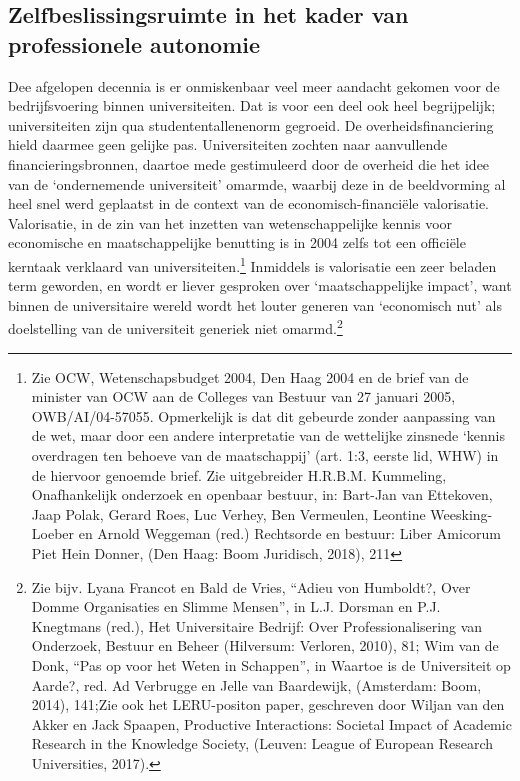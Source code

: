 \documentclass[empirical, authordate, ]{new-jote-article}
\begin{document}
	\subsection{Zelfbeslissingsruimte in het kader van professionele autonomie}



	Dee afgelopen decennia is er onmiskenbaar veel meer aandacht gekomen voor de bedrijfsvoering binnen universiteiten. Dat is voor een deel ook heel begrijpelijk; universiteiten zijn qua studententallenenorm gegroeid. De overheidsfinanciering hield daarmee geen gelijke pas. Universiteiten zochten naar aanvullende financieringsbronnen, daartoe mede gestimuleerd door de overheid die het idee van de ‘ondernemende universiteit' omarmde, waarbij deze in de beeldvorming al heel snel werd geplaatst in de context van de economisch-financiële valorisatie. Valorisatie, in de zin van het inzetten van wetenschappelijke kennis voor economische en maatschappelijke benutting is in 2004 zelfs tot een officiële kerntaak verklaard van universiteiten.\footnote{Zie OCW, Wetenschapsbudget 2004, Den Haag 2004 en de brief van de minister van OCW aan de Colleges van Bestuur van 27 januari 2005, OWB/AI/04-57055. Opmerkelijk is dat dit gebeurde zonder aanpassing van de wet, maar door een andere interpretatie van de wettelijke zinsnede ‘kennis overdragen ten behoeve van de maatschappij' (art. 1:3, eerste lid, WHW) in de hiervoor genoemde brief. Zie uitgebreider H.R.B.M. Kummeling, Onafhankelijk onderzoek en openbaar bestuur, in: Bart-Jan van Ettekoven, Jaap Polak, Gerard Roes, Luc Verhey, Ben Vermeulen, Leontine Weesking-Loeber en Arnold Weggeman (red.) Rechtsorde en bestuur: Liber Amicorum Piet Hein Donner, (Den Haag: Boom Juridisch, 2018), 211 } Inmiddels is valorisatie een zeer beladen term geworden, en wordt er liever gesproken over ‘maatschappelijke impact', want binnen de universitaire wereld wordt het louter generen van ‘economisch nut' als doelstelling van de universiteit generiek niet omarmd.\footnote{Zie bijv. Lyana Francot en Bald de Vries, “Adieu von Humboldt?, Over Domme Organisaties en Slimme Mensen”, in L.J. Dorsman en P.J. Knegtmans (red.), Het Universitaire Bedrijf: Over Professionalisering van Onderzoek, Bestuur en Beheer (Hilversum: Verloren, 2010), 81; Wim van de Donk, “Pas op voor het Weten in Schappen”, in Waartoe is de Universiteit op Aarde?, red. Ad Verbrugge en Jelle van Baardewijk, (Amsterdam: Boom, 2014), 141;Zie ook het LERU-positon paper, geschreven door Wiljan van den Akker en Jack Spaapen, Productive Interactions: Societal Impact of Academic Research in the Knowledge Society, (Leuven: League of European Research Universities, 2017).}
\end{document}
